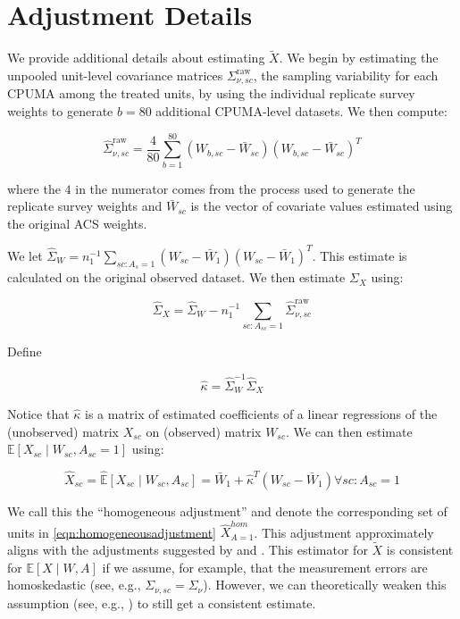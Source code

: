 \section{Adjustment Details}\label{app:adjustmentdetails}

We provide additional details about estimating $\tilde{X}$. We begin by estimating the unpooled unit-level covariance matrices $\Sigma_{\nu, sc}^{\text{raw}}$, the sampling variability for each CPUMA among the treated units, by using the individual replicate survey weights to generate $b = 80$ additional CPUMA-level datasets. We then compute:

\begin{equation}
\hat{\Sigma}_{\nu, sc}^{\text{raw}} = \frac{4}{80}\sum_{b=1}^{80}(W_{b, sc} - \bar{W}_{sc})(W_{b, sc} - \bar{W}_{sc})^T
\end{equation}

where the $4$ in the numerator comes from the process used to generate the replicate survey weights and $\bar{W}_{sc}$ is the vector of covariate values estimated using the original ACS weights.

We let $\hat{\Sigma}_{W} = n_1^{-1}\sum_{sc: A_s = 1} (W_{sc} - \bar{W}_1)(W_{sc} - \bar{W}_1)^T$. This estimate is calculated on the original observed dataset. We then estimate $\Sigma_{X}$ using:

\begin{equation}
\hat{\Sigma}_X = \hat{\Sigma}_W - n_1^{-1}\sum_{sc: A_{sc} = 1} \hat{\Sigma}_{\nu, sc}^{\text{raw}}
\end{equation}

Define

\begin{equation}
\hat{\kappa} = \hat{\Sigma}_W^{-1}\hat{\Sigma}_X
\end{equation}

Notice that $\hat{\kappa}$ is a matrix of estimated coefficients of a linear regressions of the (unobserved) matrix $X_{sc}$ on (observed) matrix $W_{sc}$. We can then estimate $\mathbb{E}[X_{sc} \mid W_{sc}, A_{sc} = 1]$ using: 

\begin{equation}\label{eqn:homogeneousadjustment}
\hat{X}_{sc} = \hat{\mathbb{E}}[X_{sc} \mid W_{sc}, A_{sc}] = \bar{W}_1 + \hat{\kappa}^T(W_{sc} - \bar{W}_1) \forall sc: A_{sc} = 1
\end{equation}

We call this the ``homogeneous adjustment'' and denote the corresponding set of units in \eqref{eqn:homogeneousadjustment} $\hat{X}_{A=1}^{hom}$. This adjustment approximately aligns with the adjustments suggested by \cite{carroll2006measurement} and \cite{gleser1992importance}. This estimator for $\tilde{X}$ is consistent for $\mathbb{E}[X \mid W, A]$ if we assume, for example, that the measurement errors are homoskedastic (see, e.g., $\Sigma_{\nu, sc} = \Sigma_{\nu}$). However, we can theoretically weaken this assumption (see, e.g., \cite{buonaccorsi2010measurement}) to still get a consistent estimate.

